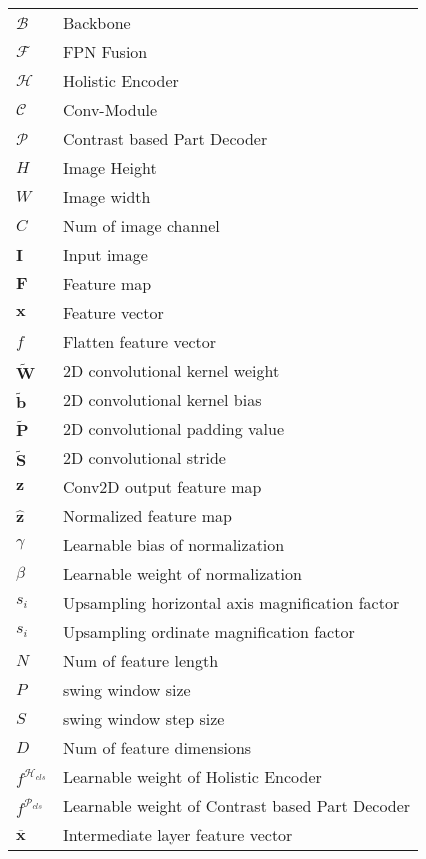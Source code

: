 \begin{tabular}{@{} l @{\hspace{3em}} l @{}}
    $\mathcal{B}$ & Backbone \\
    $\mathcal{F}$ & FPN Fusion \\
    $\mathcal{H}$ & Holistic Encoder \\
    $\mathcal{C}$ & Conv-Module \\
    $\mathcal{P}$ & Contrast based Part Decoder \\
    $H$ & Image Height \\
    $W$ & Image width \\
    $C$ & Num of image channel \\
    $\mathbf{I}$ & Input image \\
    $\mathbf{F}$ & Feature map \\
    $\boldsymbol{x}$ & Feature vector \\
    $f$ & Flatten feature vector \\
    $\tilde{\mathbf{W}}$ & 2D convolutional kernel weight \\
    $\tilde{\mathbf{b}}$ & 2D convolutional kernel bias \\
    $\tilde{\mathbf{P}}$ & 2D convolutional padding value \\
    $\tilde{\mathbf{S}}$ & 2D convolutional stride \\
    $\mathbf{z}$ & Conv2D output feature map \\
    $\hat{\mathbf{z}}$ & Normalized feature map \\
    $\gamma$ & Learnable bias of normalization \\
    $\beta$ & Learnable weight of normalization \\
    $s_i$ & Upsampling horizontal axis magnification factor \\
    $s_i$ & Upsampling ordinate magnification factor \\
    $N$ & Num of feature length \\
    $P$ & swing window size \\
    $S$ & swing window step size \\
    $D$ & Num of feature dimensions \\
    $f^{\mathcal{H}_{cls}}$ & Learnable weight of Holistic Encoder \\
    $f^{\mathcal{P}_{cls}}$ & Learnable weight of Contrast based Part Decoder \\
    $\overline{\boldsymbol{x}}$ & Intermediate layer feature vector \\

\end{tabular}

